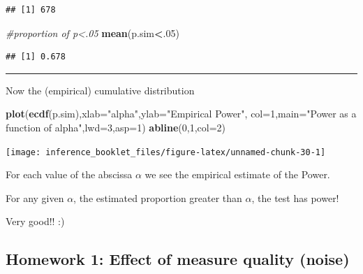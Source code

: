\documentclass[]{article}
\newenvironment{Shaded}{\begin{snugshade}}{\end{snugshade}}
\newcommand{\CommentTok}[1]{\textcolor[rgb]{0.56,0.35,0.01}{\textit{#1}}}
\newcommand{\DataTypeTok}[1]{\textcolor[rgb]{0.13,0.29,0.53}{#1}}
\newcommand{\DecValTok}[1]{\textcolor[rgb]{0.00,0.00,0.81}{#1}}
\newcommand{\KeywordTok}[1]{\textcolor[rgb]{0.13,0.29,0.53}{\textbf{#1}}}
\newcommand{\NormalTok}[1]{#1}
\newcommand{\OperatorTok}[1]{\textcolor[rgb]{0.81,0.36,0.00}{\textbf{#1}}}
\newcommand{\StringTok}[1]{\textcolor[rgb]{0.31,0.60,0.02}{#1}}
\begin{document}
\begin{verbatim}
## [1] 678
\end{verbatim}

\begin{Shaded}
\begin{Highlighting}[]
\CommentTok{#proportion of p<.05}
\KeywordTok{mean}\NormalTok{(p.sim}\OperatorTok{<}\NormalTok{.}\DecValTok{05}\NormalTok{)}
\end{Highlighting}
\end{Shaded}

\begin{verbatim}
## [1] 0.678
\end{verbatim}

\begin{center}\rule{0.5\linewidth}{\linethickness}\end{center}

Now the (empirical) cumulative distribution

\begin{Shaded}
\begin{Highlighting}[]
\KeywordTok{plot}\NormalTok{(}\KeywordTok{ecdf}\NormalTok{(p.sim),}\DataTypeTok{xlab=}\StringTok{"alpha"}\NormalTok{,}\DataTypeTok{ylab=}\StringTok{"Empirical Power"}\NormalTok{, }\DataTypeTok{col=}\DecValTok{1}\NormalTok{,}\DataTypeTok{main=}\StringTok{"Power as a function of alpha"}\NormalTok{,}\DataTypeTok{lwd=}\DecValTok{3}\NormalTok{,}\DataTypeTok{asp=}\DecValTok{1}\NormalTok{)}
\KeywordTok{abline}\NormalTok{(}\DecValTok{0}\NormalTok{,}\DecValTok{1}\NormalTok{,}\DataTypeTok{col=}\DecValTok{2}\NormalTok{)}
\end{Highlighting}
\end{Shaded}

\begin{center}\texttt{[image: inference\_booklet\_files/figure-latex/unnamed-chunk-30-1]} \end{center}

For each value of the abscissa \(\alpha\) we see the empirical estimate
of the Power.

For any given \(\alpha\), the estimated proportion greater than
\(\alpha\), the test has power!

Very good!! :)

\hypertarget{homework-1-effect-of-measure-quality-noise}{%
\subsection{Homework 1: Effect of measure quality
(noise)}\label{homework-1-effect-of-measure-quality-noise}}
\end{document}
